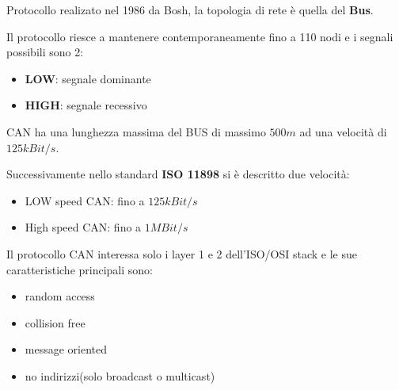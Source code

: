 Protocollo realizato nel 1986 da Bosh, la topologia di rete è quella del \textbf{Bus}.

Il protocollo riesce a mantenere contemporaneamente fino a 110 nodi e i segnali possibili sono 2:
\begin{itemize}
  \item \textbf{LOW}: segnale dominante
  \item \textbf{HIGH}: segnale recessivo
\end{itemize}


CAN ha una lunghezza massima del BUS di massimo $500m$ ad una velocità di $125kBit/s$.


Successivamente nello standard \textbf{ISO 11898} si è descritto due velocità:
\begin{itemize}
  \item LOW speed CAN: fino a $125kBit/s$
  \item High speed CAN: fino a $1MBit/s$
\end{itemize}

Il protocollo CAN interessa solo i layer 1 e 2 dell'ISO/OSI stack e le sue caratteristiche principali sono:
\begin{itemize}
  \item random access
  \item collision free
  \item message oriented
  \item no indirizzi(solo broadcast o multicast)
\end{itemize}


